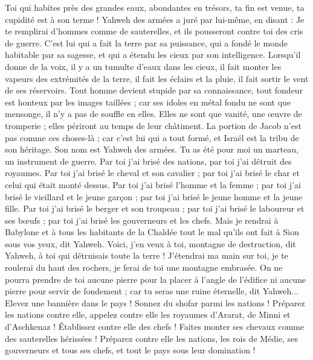 \begin{multicols}{2}
Toi qui habites près des grandes eaux, abondantes en trésors, ta fin est venue, ta cupidité est à son terme !
Yahweh des armées a juré par lui-même, en disant : Je te remplirai d'hommes comme de sauterelles, et ils pousseront contre toi des cris de guerre.
C'est lui qui a fait la terre par sa puissance, qui a fondé le monde habitable par sa sagesse, et qui a étendu les cieux par son intelligence.
Lorsqu'il donne de la voix, il y a un tumulte d'eaux dans les cieux, il fait monter les vapeurs des extrémités de la terre, il fait les éclairs et la pluie, il fait sortir le vent de ses réservoirs.
Tout homme devient stupide par sa connaissance, tout fondeur est honteux par les images taillées ; car ses idoles en métal fondu ne sont que mensonge, il n'y a pas de souffle en elles.
Elles ne sont que vanité, une œuvre de tromperie ; elles périront au temps de leur châtiment.
La portion de Jacob n'est pas comme ces choses-là ; car c'est lui qui a tout formé, et Israël est la tribu de son héritage. Son nom est Yahweh des armées.
Tu as été pour moi un marteau, un instrument de guerre. Par toi j'ai brisé des nations, par toi j'ai détruit des royaumes.
Par toi j'ai brisé le cheval et son cavalier ; par toi j'ai brisé le char et celui qui était monté dessus.
Par toi j'ai brisé l'homme et la femme ; par toi j'ai brisé le vieillard et le jeune garçon ; par toi j'ai brisé le jeune homme et la jeune fille.
Par toi j'ai brisé le berger et son troupeau ; par toi j'ai brisé le laboureur et ses bœufs ; par toi j'ai brisé les gouverneurs et les chefs.
Mais je rendrai à Babylone et à tous les habitants de la Chaldée tout le mal qu'ils ont fait à Sion sous vos yeux, dit Yahweh.
Voici, j'en veux à toi, montagne de destruction, dit Yahweh, à toi qui détruisais toute la terre ! J'étendrai ma main sur toi, je te roulerai du haut des rochers, je ferai de toi une montagne embrasée.
On ne pourra prendre de toi aucune pierre pour la placer à l'angle de l'édifice ni aucune pierre pour servir de fondement ; car tu seras une ruine éternelle, dit Yahweh...
Elevez une bannière dans le pays ! Sonnez du shofar parmi les nations ! Préparez les nations contre elle, appelez contre elle les royaumes d'Ararat, de Minni et d'Aschkenaz ! Établissez contre elle des chefs ! Faites monter ses chevaux comme des sauterelles hérissées !
Préparez contre elle les nations, les rois de Médie, ses gouverneurs et tous ses chefs, et tout le pays sous leur domination !

\end{multicols}
